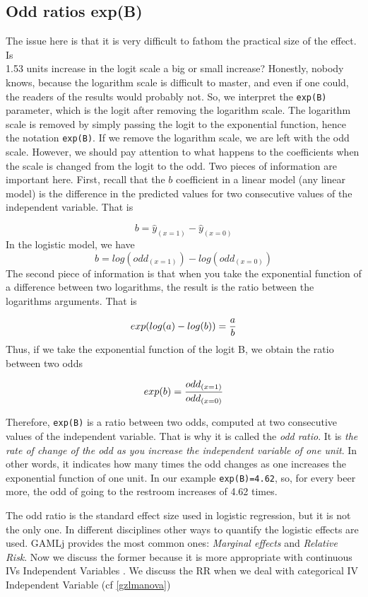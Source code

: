 \documentclass[
]{book}
\begin{document}
\hypertarget{odd-ratios-expb}{%
\subsection{Odd ratios exp(B)}\label{odd-ratios-expb}}

The issue here is that it is very difficult to fathom the practical size of the effect. Is\\
1.53 units increase in the logit scale a big or small increase? Honestly, nobody knows, because the logarithm scale is difficult to master, and even if one could, the readers of the results would probably not. So, we interpret the \texttt{exp(B)} parameter, which is the logit after removing the logarithm scale. The logarithm scale is removed by simply passing the logit to the exponential function, hence the notation \texttt{exp(B)}. If we remove the logarithm scale, we are left with the odd scale. However, we should pay attention to what happens to the coefficients when the scale is changed from the logit to the odd. Two pieces of information are important here. First, recall that the \(b\) coefficient in a linear model (any linear model) is the difference in the predicted values for two consecutive values of the independent variable. That is

\[
b=\hat{y}_{(x=1)}-\hat{y}_{(x=0)}
\]
In the logistic model, we have
\[
b=log(odd_{(x=1)})-log(odd_{(x=0)})
\]
The second piece of information is that when you take the exponential function of a difference between two logarithms, the result is the ratio between the logarithms arguments. That is

\[
exp(log(a)-log(b))={a \over b}
\]
Thus, if we take the exponential function of the logit B, we obtain the ratio between two odds

\[
exp(b)={odd_{(x=1)} \over odd_{(x=0)}}
\]

Therefore, \texttt{exp(B)} is a ratio between two odds, computed at two consecutive values of the independent variable. That is why it is called the \emph{odd ratio}. It is \emph{the rate of change of the odd as you increase the independent variable of one unit}. In other words, it indicates how many times the odd changes as one increases the exponential function of one unit. In our example \texttt{exp(B)=4.62}, so, for every beer more, the odd of going to the restroom increases of 4.62 times.

The odd ratio is the standard effect size used in logistic regression, but it is not the only one. In different disciplines other ways to quantify the logistic effects are used. {GAMLj} provides the most common ones: \emph{Marginal effects} and \emph{Relative Risk}. Now we discuss the former because it is more appropriate with continuous {IVs {Independent Variables} }. We discuss the RR when we deal with categorical {IV {Independent Variable} } (cf \ref{gzlmanova})
\end{document}
